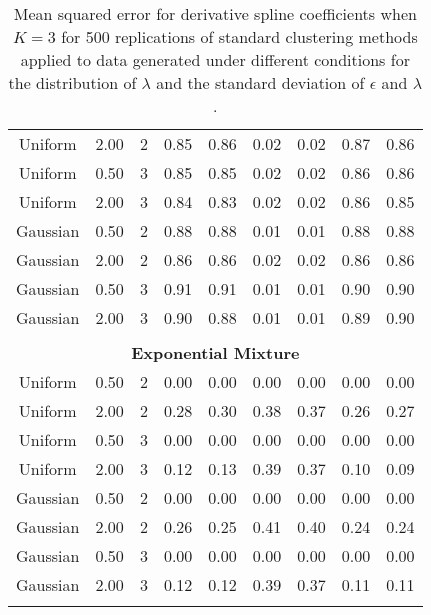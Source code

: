 \begin{table}[ht]
\begin{center}
\begin{tabular}{ccc|cccccc}
  Uniform & 2.00 &   2 & 0.85 & 0.86 & 0.02 & 0.02 & 0.87 & 0.86 \\ 
  Uniform & 0.50 &   3 & 0.85 & 0.85 & 0.02 & 0.02 & 0.86 & 0.86 \\ 
  Uniform & 2.00 &   3 & 0.84 & 0.83 & 0.02 & 0.02 & 0.86 & 0.85 \\ 
  Gaussian & 0.50 &   2 & 0.88 & 0.88 & 0.01 & 0.01 & 0.88 & 0.88 \\ 
  Gaussian & 2.00 &   2 & 0.86 & 0.86 & 0.02 & 0.02 & 0.86 & 0.86 \\ 
  Gaussian & 0.50 &   3 & 0.91 & 0.91 & 0.01 & 0.01 & 0.90 & 0.90 \\ 
  Gaussian & 2.00 &   3 & 0.90 & 0.88 & 0.01 & 0.01 & 0.89 & 0.90 \\ 
   \\ \multicolumn{9}{c}{\textbf{Exponential Mixture}}\\Uniform & 0.50 &   2 & 0.00 & 0.00 & 0.00 & 0.00 & 0.00 & 0.00 \\ 
  Uniform & 2.00 &   2 & 0.28 & 0.30 & 0.38 & 0.37 & 0.26 & 0.27 \\ 
  Uniform & 0.50 &   3 & 0.00 & 0.00 & 0.00 & 0.00 & 0.00 & 0.00 \\ 
  Uniform & 2.00 &   3 & 0.12 & 0.13 & 0.39 & 0.37 & 0.10 & 0.09 \\ 
  Gaussian & 0.50 &   2 & 0.00 & 0.00 & 0.00 & 0.00 & 0.00 & 0.00 \\ 
  Gaussian & 2.00 &   2 & 0.26 & 0.25 & 0.41 & 0.40 & 0.24 & 0.24 \\ 
  Gaussian & 0.50 &   3 & 0.00 & 0.00 & 0.00 & 0.00 & 0.00 & 0.00 \\ 
  Gaussian & 2.00 &   3 & 0.12 & 0.12 & 0.39 & 0.37 & 0.11 & 0.11 \\ 
   \thickhline\end{tabular}
\caption{Mean squared error for derivative spline coefficients when $K=3$ for 500 replications of standard clustering methods applied to data generated under different conditions for the distribution of $\lambda$ and the standard deviation of $\epsilon$ and $\lambda$.}
\label{tab:mse1}
\end{center}
\end{table}
